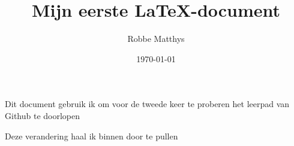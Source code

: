 \documentclass{article}
\title{Mijn eerste \LaTeX -document}
\author{Robbe Matthys}
\date{\today}
\begin{document}
	Dit document gebruik ik om voor de tweede keer te proberen het leerpad van Github te doorlopen
	
	Deze verandering haal ik binnen door te pullen
\end{document}

